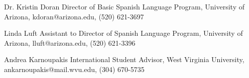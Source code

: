 


\begin{cvskills}


\cvskill
{Dr. Kristin Doran} %
{Director of Basic Spanish Language Program, 
University of Arizona, 
kdoran@arizona.edu, 
(520) 621-3697} %

\cvskill
{Linda Luft} %
{Assistant to Director of Spanish Language Program, 
University of Arizona, 
lluft@arizona.edu, 
(520) 621-3396} %

\cvskill
{Andrea Karnoupakis} %
{International Student Advisor, 
West Virginia University, 
ankarnoupakis@mail.wvu.edu, 
(304) 670-5735} %


\vspace{-7mm}
\end{cvskills}